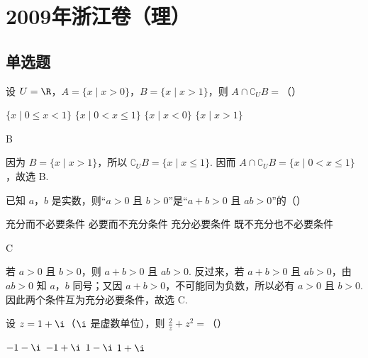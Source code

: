 
\chapter{2009年浙江卷（理）}

\section{单选题}

\begin{problem}
设 \(U=\R\)，\(A=\{x\mid x>0\}\)，\(B=\{x\mid x>1\}\)，则 \(A\cap\complement_U B=\)（\quad）

\choices
    {\(\{x\mid 0\leqslant x<1\}\)}
    {\(\{x\mid 0<x\leqslant 1\}\)}
    {\(\{x\mid x<0\}\)}
    {\(\{x\mid x>1\}\)}
\end{problem}

\begin{answer}
B
\end{answer}

\begin{solution}
因为 \(B=\{x\mid x>1\}\)，所以 \(\complement_U B=\{x\mid x\leqslant 1\}\). 因而 \(A\cap\complement_U B=\{x\mid 0<x\leqslant 1\}\)，故选 B.
\end{solution}

\begin{problem}
已知 \(a\)，\(b\) 是实数，则“\(a>0\) 且 \(b>0\)”是“\(a+b>0\) 且 \(ab>0\)”的（\quad）

\choices
    {充分而不必要条件}
    {必要而不充分条件}
    {充分必要条件}
    {既不充分也不必要条件}
\end{problem}

\begin{answer}
C
\end{answer}

\begin{solution}
若 \(a>0\) 且 \(b>0\)，则 \(a+b>0\) 且 \(ab>0\). 反过来，若 \(a+b>0\) 且 \(ab>0\)，由 \(ab>0\) 知 \(a\)，\(b\) 同号；又因 \(a+b>0\)，不可能同为负数，所以必有 \(a>0\) 且 \(b>0\). 因此两个条件互为充分必要条件，故选 C.
\end{solution}

\begin{problem}
设 \(z=1+\i\)（\(\i\) 是虚数单位），则 \(\frac{2}{z}+z^2=\)（\quad）

\choices
    {\(-1-\i\)}
    {\(-1+\i\)}
    {\(1-\i\)}
    {\(1+\i\)}
\end{problem}


